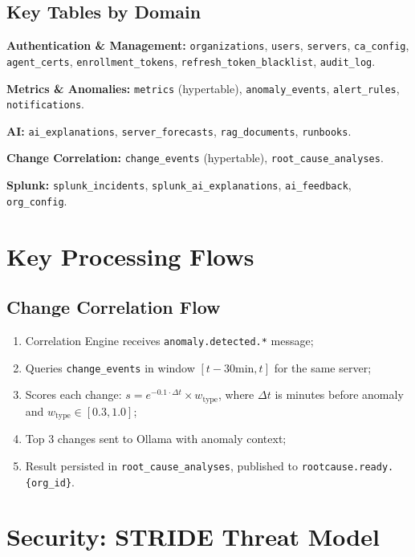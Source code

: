 \subsection{Key Tables by Domain}

\textbf{Authentication \& Management:} \texttt{organizations}, \texttt{users},
\texttt{servers}, \texttt{ca\_config}, \texttt{agent\_certs},
\texttt{enrollment\_tokens}, \texttt{refresh\_token\_blacklist}, \texttt{audit\_log}.

\textbf{Metrics \& Anomalies:} \texttt{metrics} (hypertable), \texttt{anomaly\_events},
\texttt{alert\_rules}, \texttt{notifications}.

\textbf{AI:} \texttt{ai\_explanations}, \texttt{server\_forecasts}, \texttt{rag\_documents},
\texttt{runbooks}.

\textbf{Change Correlation:} \texttt{change\_events} (hypertable),
\texttt{root\_cause\_analyses}.

\textbf{Splunk:} \texttt{splunk\_incidents}, \texttt{splunk\_ai\_explanations},
\texttt{ai\_feedback}, \texttt{org\_config}.

\section{Key Processing Flows}

\subsection{Change Correlation Flow}

\begin{enumerate}
  \item Correlation Engine receives \texttt{anomaly.detected.*} message;
  \item Queries \texttt{change\_events} in window $[t - 30\text{min}, t]$
    for the same server;
  \item Scores each change: $s = e^{-0.1 \cdot \Delta t} \times w_{\text{type}}$,
    where $\Delta t$ is minutes before anomaly and $w_{\text{type}} \in [0.3, 1.0]$;
  \item Top 3 changes sent to Ollama with anomaly context;
  \item Result persisted in \texttt{root\_cause\_analyses}, published to
    \texttt{rootcause.ready.\{org\_id\}}.
\end{enumerate}

\section{Security: STRIDE Threat Model}

